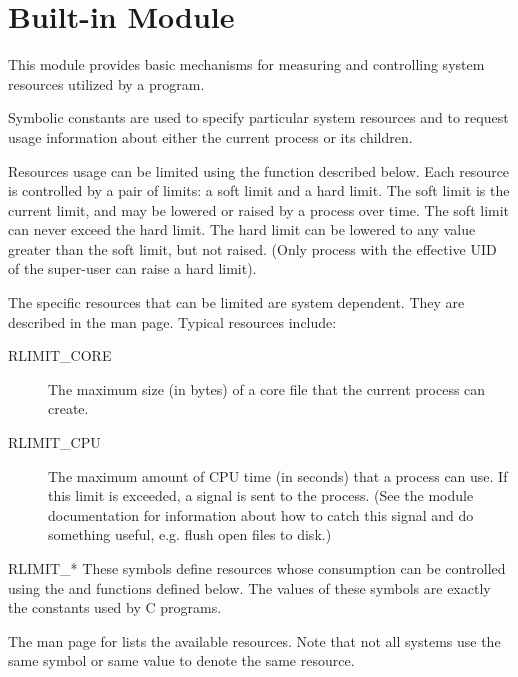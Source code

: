 \section{Built-in Module }

This module provides basic mechanisms for measuring and controlling
system resources utilized by a program.

Symbolic constants are used to specify particular system resources and
to request usage information about either the current process or its
children. 

Resources usage can be limited using the  function
described below. Each resource is controlled by a pair of limits: a
soft limit and a hard limit. The soft limit is the current limit, and
may be lowered or raised by a process over time. The soft limit can
never exceed the hard limit. The hard limit can be lowered to any
value greater than the soft limit, but not raised. (Only process with
the effective UID of the super-user can raise a hard limit).

The specific resources that can be limited are system dependent. They
are described in the  man page. Typical resources
include:

\begin{description}

\item[RLIMIT_CORE]
The maximum size (in bytes) of a core file that the current process
can create.

\item[RLIMIT_CPU]
The maximum amount of CPU time (in seconds) that a process can use. If
this limit is exceeded, a  signal is sent to the
process. (See the  module documentation for information
about how to catch this signal and do something useful, e.g. flush
open files to disk.)

\end{description}

\begin{datadesc}{RLIMIT_*}
  These symbols define resources whose consumption can be controlled
  using the  and  functions defined
  below. The values of these symbols are exactly the constants used
  by C programs.

  The \UNIX{} man page for  lists the available
  resources. Note that not all systems use the same symbol or same
  value to denote the same resource.
\end{datadesc}

